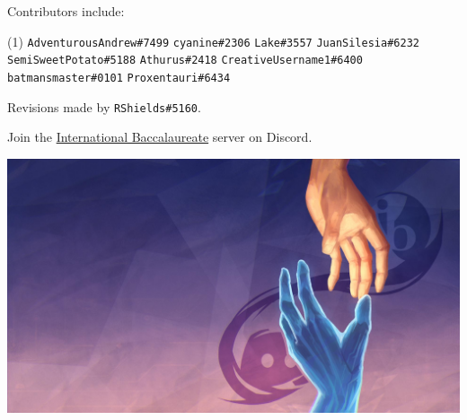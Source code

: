 \documentclass[12pt,a4paper]{book}
\begin{document}
\thispagestyle{empty}

\hspace{1in}Contributors include:
\begin{tasks}[style=itemize, item-indent=1in + 2em, label-offset=0em, column-sep=-1in, after-item-skip=0ex](1)
    \task \lstinline|AdventurousAndrew#7499|
    \task \lstinline|cyanine#2306|
    \task \lstinline|Lake#3557|
    \task \lstinline|JuanSilesia#6232|
    \task \lstinline|SemiSweetPotato#5188|
    \task \lstinline|Athurus#2418|
    \task \lstinline|CreativeUsername1#6400|
    \task \lstinline|batmansmaster#0101|
    \task \lstinline|Proxentauri#6434|
\end{tasks}
\hspace{1in}Revisions made by \lstinline|RShields#5160|.
\vfill


\begin{center}
    \large Join the \href{https://discord.gg/IBO}{\color{blue} International Baccalaureate} server on Discord.
\end{center}

\includegraphics[width=\textwidth]{ib_server_invite_bg.jpg}

\restoregeometry

\tableofcontents



\newpage
\newpage
\newpage
\newpage
\newpage
\newpage
\newpage
\newpage
\newpage
\newpage
\end{document}
